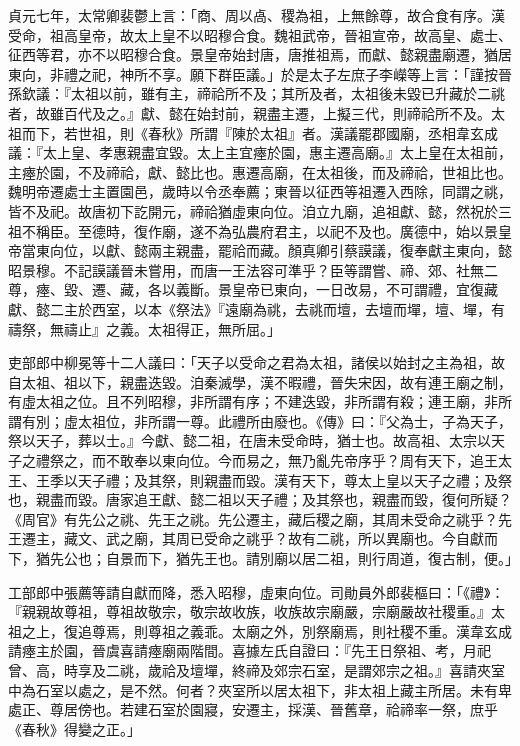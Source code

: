 \begin{pinyinscope}
 貞元七年，太常卿裴鬱上言：「商、周以卨、稷為祖，上無餘尊，故合食有序。漢受命，祖高皇帝，故太上皇不以昭穆合食。魏祖武帝，晉祖宣帝，故高皇、處士、征西等君，亦不以昭穆合食。景皇帝始封唐，唐推祖焉，而獻、懿親盡廟遷，猶居東向，非禮之祀，神所不享。願下群臣議。」於是太子左庶子李嶸等上言：「謹按晉孫欽議：『太祖以前，雖有主，禘祫所不及；其所及者，太祖後未毀已升藏於二祧者，故雖百代及之。』獻、懿在始封前，親盡主遷，上擬三代，則禘祫所不及。太祖而下，若世祖，則《春秋》所謂『陳於太祖』者。漢議罷郡國廟，丞相韋玄成議：『太上皇、孝惠親盡宜毀。太上主宜瘞於園，惠主遷高廟。』太上皇在太祖前，主瘞於園，不及禘祫，獻、懿比也。惠遷高廟，在太祖後，而及禘祫，世祖比也。魏明帝遷處士主置園邑，歲時以令丞奉薦；東晉以征西等祖遷入西除，同謂之祧，皆不及祀。故唐初下訖開元，禘祫猶虛東向位。洎立九廟，追祖獻、懿，然祝於三祖不稱臣。至德時，復作廟，遂不為弘農府君主，以祀不及也。廣德中，始以景皇帝當東向位，以獻、懿兩主親盡，罷祫而藏。顏真卿引蔡謨議，復奉獻主東向，懿昭景穆。不記謨議晉未嘗用，而唐一王法容可準乎？臣等謂嘗、禘、郊、社無二尊，瘞、毀、遷、藏，各以義斷。景皇帝已東向，一日改易，不可謂禮，宜復藏獻、懿二主於西室，以本《祭法》『遠廟為祧，去祧而壇，去壇而墠，壇、墠，有禱祭，無禱止』之義。太祖得正，無所屈。」



 吏部郎中柳冕等十二人議曰：「天子以受命之君為太祖，諸侯以始封之主為祖，故自太祖、祖以下，親盡迭毀。洎秦滅學，漢不暇禮，晉失宋因，故有連王廟之制，有虛太祖之位。且不列昭穆，非所謂有序；不建迭毀，非所謂有殺；連王廟，非所謂有別；虛太祖位，非所謂一尊。此禮所由廢也。《傳》曰：『父為士，子為天子，祭以天子，葬以士。』今獻、懿二祖，在唐未受命時，猶士也。故高祖、太宗以天子之禮祭之，而不敢奉以東向位。今而易之，無乃亂先帝序乎？周有天下，追王太王、王季以天子禮；及其祭，則親盡而毀。漢有天下，尊太上皇以天子之禮；及祭也，親盡而毀。唐家追王獻、懿二祖以天子禮；及其祭也，親盡而毀，復何所疑？《周官》有先公之祧、先王之祧。先公遷主，藏后稷之廟，其周未受命之祧乎？先王遷主，藏文、武之廟，其周已受命之祧乎？故有二祧，所以異廟也。今自獻而下，猶先公也；自景而下，猶先王也。請別廟以居二祖，則行周道，復古制，便。」



 工部郎中張薦等請自獻而降，悉入昭穆，虛東向位。司勛員外郎裴樞曰：「《禮》：『親親故尊祖，尊祖故敬宗，敬宗故收族，收族故宗廟嚴，宗廟嚴故社稷重。』太祖之上，復追尊焉，則尊祖之義乖。太廟之外，別祭廟焉，則社稷不重。漢韋玄成請瘞主於園，晉虞喜請瘞廟兩階間。喜據左氏自證曰：『先王日祭祖、考，月祀曾、高，時享及二祧，歲祫及壇墠，終禘及郊宗石室，是謂郊宗之祖。』喜請夾室中為石室以處之，是不然。何者？夾室所以居太祖下，非太祖上藏主所居。未有卑處正、尊居傍也。若建石室於園寢，安遷主，採漢、晉舊章，祫禘率一祭，庶乎《春秋》得變之正。」




\end{pinyinscope}
